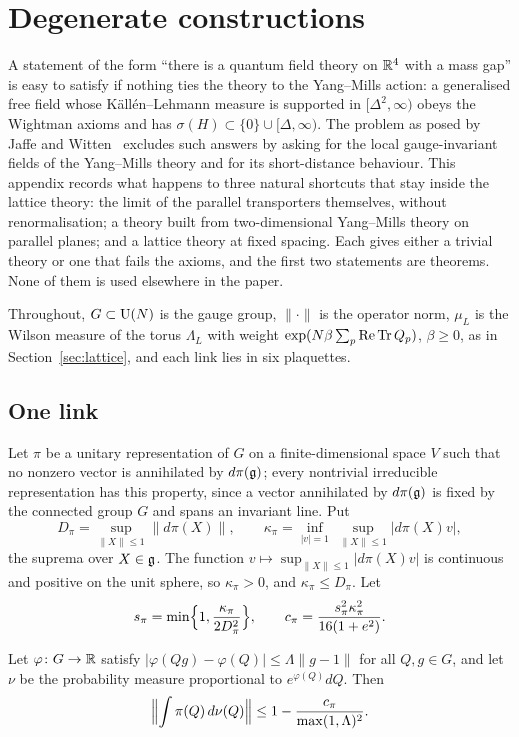 \section{Degenerate constructions}
\label{app:degenerate}

A statement of the form ``there is a quantum field theory on $\mathbb{R}^4$ with a
mass gap'' is easy to satisfy if nothing ties the theory to the Yang--Mills
action: a generalised free field whose K\"all\'en--Lehmann measure is supported
in $[\Delta^2,\infty)$ obeys the Wightman axioms and has
$\sigma(H)\subset\{0\}\cup[\Delta,\infty)$. The problem as posed by Jaffe and
Witten~\cite{JW06} excludes such answers by asking for the local gauge-invariant
fields of the Yang--Mills theory and for its short-distance behaviour. This
appendix records what happens to three natural shortcuts that stay inside the
lattice theory: the limit of the parallel transporters themselves, without
renormalisation; a theory built from two-dimensional Yang--Mills theory on
parallel planes; and a lattice theory at fixed spacing. Each gives either a
trivial theory or one that fails the axioms, and the first two statements are
theorems. None of them is used elsewhere in the paper.

Throughout, $G\subset\mathrm{U}(N)$ is the gauge group, $\|\cdot\|$ is the operator
norm, $\mu_L$ is the Wilson measure of the torus $\Lambda_L$ with weight
$\exp(N\beta\sum_p\operatorname{Re}\operatorname{Tr} Q_p)$, $\beta\ge0$, as in Section~\ref{sec:lattice},
and each link lies in six plaquettes.

\subsection{One link}

Let $\pi$ be a unitary representation of $G$ on a finite-dimensional space $V$
such that no nonzero vector is annihilated by $d\pi(\mathfrak{g})$; every nontrivial
irreducible representation has this property, since a vector annihilated by
$d\pi(\mathfrak{g})$ is fixed by the connected group $G$ and spans an invariant line.
Put
\[
D_\pi=\sup_{\|X\|\le1}\|d\pi(X)\|,\qquad
\kappa_\pi=\inf_{|v|=1}\ \sup_{\|X\|\le1}|d\pi(X)v|,
\]
the suprema over $X\in\mathfrak{g}$. The function $v\mapsto\sup_{\|X\|\le1}|d\pi(X)v|$
is continuous and positive on the unit sphere, so $\kappa_\pi>0$, and
$\kappa_\pi\le D_\pi$. Let
\[
s_\pi=\min\Bigl\{1,\frac{\kappa_\pi}{2D_\pi^2}\Bigr\},\qquad
c_\pi=\frac{s_\pi^2\kappa_\pi^2}{16(1+e^2)}.
\]

\begin{lemma}\label{lem:onelinkdecay}
Let $\varphi\colon G\to\mathbb{R}$ satisfy $|\varphi(Qg)-\varphi(Q)|\le\Lambda\|g-1\|$
for all $Q,g\in G$, and let $\nu$ be the probability measure proportional to
$e^{\varphi(Q)}dQ$. Then
\[
\Bigl\|\int\pi(Q)\,d\nu(Q)\Bigr\|\le1-\frac{c_\pi}{\max(1,\Lambda)^2}.
\]
\end{lemma}

